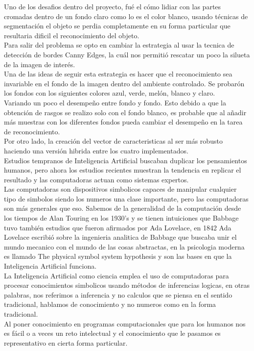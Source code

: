 \documentclass[a4paper, 11pt]{article}
\begin{document}
Uno de los desafios dentro del proyecto, fué el cómo lidiar con las partes cromadas dentro de un fondo claro como lo es el color blanco, usando técnicas de segmentación el objeto se perdia completamente en su forma particular que resultaria dificil el reconocimiento del objeto.\\

Para salir del problema se opto en cambiar la estrategia al usar la tecnica de detección de bordes Canny Edges, la cuál nos permitió rescatar un poco la silueta de la imagen de interés.\\

Una de las ideas de seguir esta estrategia es hacer que el reconocimiento sea invariable en el fondo de la imagen dentro del ambiente controlado. Se probarón los fondos con los siguientes colores azul, verde, melón, blanco y claro.\\

Variando un poco el desempeño entre fondo y fondo. Esto debido a que la obtención de rasgos se realizo solo con el fondo blanco, es probable que al añadir más muestras con los diferentes fondos pueda cambiar el desempeño en la tarea de reconocimiento.\\

Por otro lado, la creación del vector de caracteristicas al ser más robusto haciendo una versión hibrida entre los cuatro implementados.\\

Estudios tempranos de Inteligencia Artificial buscaban duplicar los pensamientos humanos, pero ahora los estudios recientes muestran la tendencia en replicar el resultado y las computadoras actuan como sistemas expertos.\\

Las computadoras son dispositivos simbolicos capaces de manipular cualquier tipo de simbolos siendo los numeros una clase importante, pero las computadoras son más generales que eso. Sabemos de la generalidad de la computación desde los tiempos de Alan Touring en los 1930's y se tienen intuiciones que Babbage tuvo también estudios que fueron afirmados por Ada Lovelace, en 1842 Ada Lovelace escribió sobre la ingenieria analitica de Babbage que buscaba unir el mundo mecanico con el mundo de las cosas abstractas, en la psicologia moderna es llamado The physical symbol system hypothesis y son las bases en que la Inteligencia Artificial funciona.\\

La Inteligencia Artificial como ciencia emplea el uso de computadoras para procesar conocimientos simbolicos usando métodos de inferencias logicas, en otras palabras, nos referimos a inferencia y no calculos que se piensa en el sentido tradicional, hablamos de conocimiento y no numeros como en la forma tradicional.\\
Al poner conocimiento en programas computacionales que para los humanos nos es fácil o a veces un reto intelectual y el conocimiento que le pasamos es representativo en cierta forma particular.\\
\end{document}

